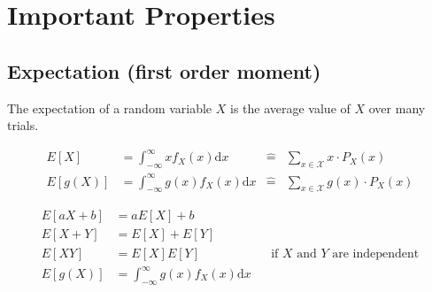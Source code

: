 \section{Important Properties}
\begin{mdframed}[style=eqbox]
  \subsection{Expectation (first order moment)}
  The expectation of a random variable $X$ is the average value of $X$ over many trials.
  \begin{mdframed}[style=redbox]
    \vspace*{-11pt}
    \begin{align*}
      E[X] &= \int_{-\infty}^{\infty} x f_X(x) \text{d}x &\hat{ =}& \sum_{x \in \mathcal{X}} x \cdot P_X(x)\\
      E[g(X)] &= \int_{-\infty}^{\infty} g(x) f_X(x) \text{d}x &\hat{ =}& \sum_{x \in \mathcal{X}} g(x) \cdot P_X(x)
  \end{align*}
  \end{mdframed}
  \vspace*{-9pt}\begin{align*}
    E[aX + b] &= aE[X] + b\\
    E[X + Y] &= E[X] + E[Y]\\
    E[XY] &= E[X]E[Y] && \text{if~} X \text{~and~} Y \text{~are independent}\\
    E[g(X)] &= \int_{-\infty}^{\infty} g(x) f_X(x) \text{d}x
  \end{align*}
\end{mdframed}

